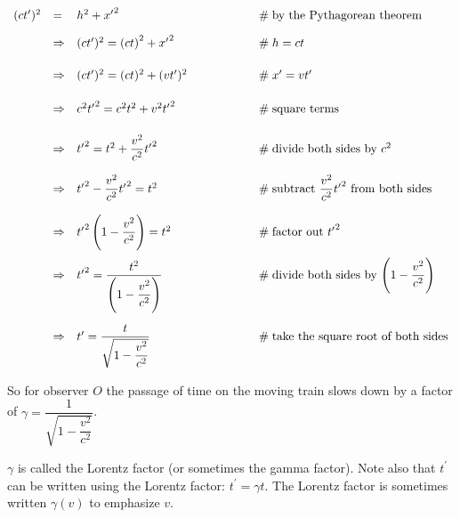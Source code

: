\documentclass{article}
\theoremstyle{definition}
\begin{document}
\bigskip
\begin{equation*}
 \begin{array}{llll}
     (c t^{\prime})^2
     &=& h^2 + {x^{\prime}}^2 					
     		&\hspace{5.00em} \mathrel{\#} \text{by the Pythagorean theorem} \\
[10pt]
     &\Rightarrow& (c t^{\prime})^2 = {(ct)}^2 + {x^{\prime}}^2 					
     		&\hspace{5.00em} \mathrel{\#} h = c t \\
[15pt]
	&\Rightarrow& (c t^{\prime})^2 = (ct)^2 + (v t^{\prime})^2
			&\hspace{5.00em} \mathrel{\#} x^{\prime} = v t^{\prime} \\
[15pt]
	&\Rightarrow& c^2 {t^{\prime}}^2 = c^2t^2 + v^2 {t^{\prime}}^2
			&\hspace{5.00em} \mathrel{\#}  \text{square terms} \\
[15pt]
	&\Rightarrow& {t^{\prime}}^2 = t^2 + \dfrac{v^2}{c^2} {t^{\prime}}^2
			&\hspace{5.00em} \mathrel{\#}  \text{divide both sides by $c^2$} \\
[15pt]
	&\Rightarrow& {t^{\prime}}^2 - \dfrac{v^2}{c^2} {t^{\prime}}^2 = t^2 
			&\hspace{5.00em} \mathrel{\#}  \text{subtract $\dfrac{v^2}{c^2} 
			{t^{\prime}}^2$ from both sides} \\
[15pt]
	&\Rightarrow& {t^{\prime}}^2 \left (1 - \dfrac{v^2}{c^2} \right) = t^2 
			&\hspace{5.00em} \mathrel{\#} \text{factor out ${t^{\prime}}^2$} \\
[15pt]	
	&\Rightarrow& {t^{\prime}}^2 = \dfrac{t^2}{\left (1 - \dfrac{v^2}{c^2} \right)}
			&\hspace{5.00em} \mathrel{\#}  \text{divide both sides by $\left 
			(1 - \dfrac{v^2}{c^2}\right )$} \\
[35pt]
	&\Rightarrow& t^{\prime} = \dfrac{t}{\sqrt{1 - \dfrac{v^2}{c^2}}}
			&\hspace{5.00em} \mathrel{\#}  \text{take the square root of both sides}
  \end{array}
\end{equation*}


\bigskip
\noindent
So for observer $O$ the passage of time on the moving train slows
down by a factor of $\gamma = \dfrac{1}{\sqrt{1-\dfrac{v^2}{c^2}}}$.

\bigskip
\noindent
$\gamma$ is called the Lorentz factor (or sometimes the gamma
factor). Note also that $t^{\prime}$ can be written using the
Lorentz factor: $t^{\prime} = \gamma t$. The Lorentz factor is
sometimes written $\gamma(v)$ to emphasize $v$.
%
%
%
\end{document}
